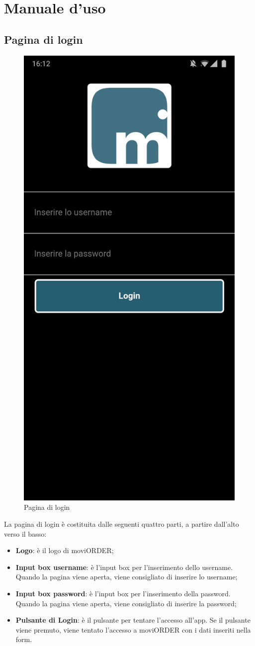 \section{Manuale d'uso}

\subsection{Pagina di login}

\begin{figure}[h]
	\centering
	\includegraphics[width=.3\textwidth]{./img/login.jpg}
	\caption{Pagina di login}
\end{figure}

La pagina di login è costituita dalle seguenti quattro parti, a partire dall'alto verso il basso:
\begin{itemize}
	\item \textbf{Logo}: è il logo di moviORDER;
	\item \textbf{Input box username}: è l'input box per l'inserimento dello username. Quando la pagina viene aperta, viene consigliato di inserire lo 		username;
	\item \textbf{Input box password}: è l'input box per l'inserimento della password. Quando la pagina viene aperta, viene consigliato di inserire la 		password;
	\item \textbf{Pulsante di Login}: è il pulsante per tentare l'accesso all'app. Se il pulsante viene premuto, viene tentato l'accesso a moviORDER con i dati inseriti nella form.
\end{itemize}

